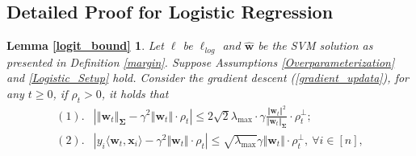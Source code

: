 \documentclass[pdflatex,sn-basic]{sn-jnl}%
\theoremstyle{thmstyleone}%
\begin{document}
\begin{appendices}
\section{Detailed Proof for Logistic Regression}\label{Detailed_Proof_for_Logistic_Regression}
\newtheorem*{restate_logit_bound}{Lemma \ref{logit_bound}}
\begin{shaded}
\begin{restate_logit_bound}
  Let $\ell$ be $\ell_{log}$ and $\hat{\mathbf{w}}$ be the SVM solution as presented in Definition \ref{margin}. 
  Suppose Assumptions \ref{Overparameterization} and \ref{Logistic_Setup} hold.
  Consider the gradient descent (\ref{gradient_updata}), for any $t \ge 0$,
  if $\rho_t > 0$, it holds that 
  \begin{equation*}
  \begin{aligned}
    (1). &
    \left|
      \left\Vert \mathbf{w}_t \right\Vert_{\mathbf{\Sigma}}
      -
      \gamma^2 \left\Vert \mathbf{w}_t \right\Vert
      \cdot
      \rho_t
    \right|
    \le
    2 \sqrt{2} \lambda_{\max} \cdot \gamma \frac{\Vert \mathbf{w}_t \Vert^2}{\Vert \mathbf{w}_t \Vert_{\mathbf{\Sigma}}}
    \cdot \rho_t^{\perp}; 
    \\ (2). &
    \left| y_i \langle \mathbf{w}_t, \mathbf{x}_i \rangle  - \gamma^2 \Vert \mathbf{w}_t \Vert \cdot \rho_t \right|
    \le 
    \sqrt{\lambda_{\max}} \gamma \Vert \mathbf{w}_t \Vert \cdot \rho_t^{\perp}, 
    \ \forall i \in [n],
  \end{aligned}
  \end{equation*}

\end{restate_logit_bound}
\end{shaded}
\end{appendices}
\end{document}
